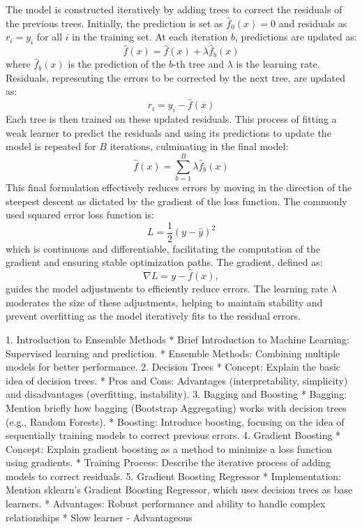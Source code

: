 The model is constructed iteratively by adding trees to correct the residuals of the previous trees. 
Initially, the prediction is set as $\hat{f}_0(x) = 0$ and residuals as $r_i = y_i$ for all $i$ in the training set. 
At each iteration $b$, predictions are updated as:
$$
    \hat{f}(x) = \hat{f}(x) + \lambda \hat{f}_b(x)
$$
where $\hat{f}_b(x)$ is the prediction of the $b$-th tree and $\lambda$ is the learning rate. Residuals, representing the errors to be corrected by the next tree, are updated as:
$$
    r_i = y_i - \hat{f}(x)
$$
Each tree is then trained on these updated residuals. This process of fitting a weak learner to predict the residuals and using its predictions to update the model is repeated for $B$ iterations, culminating in the final model:
$$
    \hat{f}(x) = \sum_{b=1}^{B} \lambda \hat{f}_b(x) 
$$
This final formulation effectively reduces errors by moving in the direction of the steepest descent as dictated by the gradient of the loss function. The commonly used squared error loss function is:
$$
L = \frac{1}{2}(y - \hat{y})^2
$$
which is continuous and differentiable, facilitating the computation of the gradient and ensuring stable optimization paths. The gradient, defined as:
$$
    \nabla L = y - \hat{f}(x),
$$
guides the model adjustments to efficiently reduce errors. 
The learning rate $\lambda$ moderates the size of these adjustments, helping to maintain stability and prevent overfitting as the model iteratively fits to the residual errors.


1. Introduction to Ensemble Methods
    * Brief Introduction to Machine Learning: Supervised learning and prediction.
    * Ensemble Methods: Combining multiple models for better performance.
2. Decision Trees
    * Concept: Explain the basic idea of decision trees.
    * Pros and Cons: Advantages (interpretability, simplicity) and disadvantages (overfitting, instability).
3. Bagging and Boosting
    * Bagging: Mention briefly how bagging (Bootstrap Aggregating) works with decision trees (e.g., Random Forests).
    * Boosting: Introduce boosting, focusing on the idea of sequentially training models to correct previous errors.
4. Gradient Boosting
    * Concept: Explain gradient boosting as a method to minimize a loss function using gradients.
    * Training Process: Describe the iterative process of adding models to correct residuals.
5. Gradient Boosting Regressor
    * Implementation: Mention sklearn's Gradient Boosting Regressor, which uses decision trees as base learners.
    * Advantages: Robust performance and ability to handle complex relationships
    * Slow learner - Advantageous